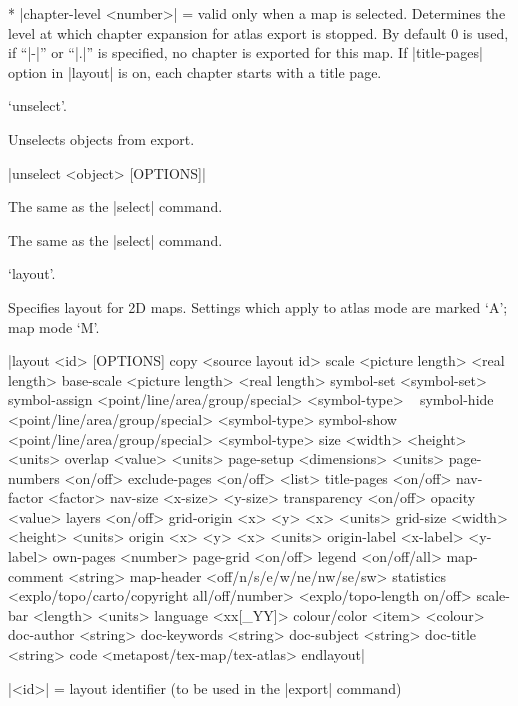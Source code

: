   * |chapter-level <number>| = valid only when a map is selected. Determines
    the level at which chapter expansion for atlas export is stopped. 
    By default 0 is used, if ``|-|'' or ``|.|'' is specified, no chapter is
    exported for this map. If |title-pages| option in |layout| is on,
    each chapter starts with a title page.
\endoptions



\subsubchapter `unselect'.

\description
  Unselects objects from export.
\enddescription

\syntax
  |unselect <object> [OPTIONS]|
\endsyntax

\arguments
  The same as the |select| command.
\endarguments

\options
  The same as the |select| command. 
\endoptions


\subsubchapter `layout'.

\description
  Specifies layout for 2D maps. Settings which apply to atlas mode
  are marked `A'; map mode `M'.
\enddescription

\syntax
|layout <id> [OPTIONS]
    copy <source layout id>
    scale <picture length> <real length>
    base-scale <picture length> <real length>
    symbol-set <symbol-set>
    symbol-assign <point/line/area/group/special> <symbol-type> \ 
                                                  <symbol-set>
    symbol-hide <point/line/area/group/special> <symbol-type>
    symbol-show <point/line/area/group/special> <symbol-type>
    size <width> <height> <units>
    overlap <value> <units>
    page-setup <dimensions> <units>
    page-numbers <on/off>
    exclude-pages <on/off> <list>
    title-pages <on/off>
    nav-factor <factor>
    nav-size <x-size> <y-size>
    transparency <on/off>
    opacity <value>
    layers <on/off>
    grid-origin <x> <y> <x> <units>
    grid-size <width> <height> <units>
    origin <x> <y> <x> <units>
    origin-label <x-label> <y-label>
    own-pages <number>
    page-grid <on/off>
    legend <on/off/all>
    map-comment <string>
    map-header <off/n/s/e/w/ne/nw/se/sw>
    statistics <explo/topo/carto/copyright all/off/number>
               <explo/topo-length on/off>
    scale-bar <length> <units>
    language <xx[_YY]>
    colour/color <item> <colour>
    doc-author <string>
    doc-keywords <string>
    doc-subject <string>
    doc-title <string>
    code <metapost/tex-map/tex-atlas>
endlayout|
\endsyntax

\arguments
  |<id>| = layout identifier (to be used in the |export| command)
\endarguments

